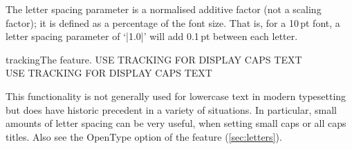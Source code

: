\documentclass[a4paper]{l3doc}
\begin{document}
The letter spacing parameter is a normalised additive factor (not a scaling factor); it is defined as a percentage of the font size. That is, for a 10\,pt font, a letter spacing parameter of `|1.0|' will add 0.1\,pt between each letter.

\begin{Xexample}{tracking}{The  feature.}
  USE TRACKING FOR DISPLAY CAPS TEXT \\
  USE TRACKING FOR DISPLAY CAPS TEXT
\end{Xexample}

This functionality is not generally used for lowercase text in modern typesetting but does have historic precedent in a variety of situations.
In particular, small amounts of letter spacing can be very useful, when setting small caps or all caps titles.
Also see the OpenType  option of the  feature (\vref{sec:letters}).
\end{document}
